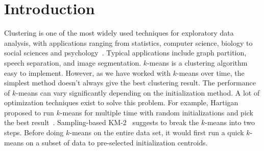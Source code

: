 \documentclass{acm_proc_article-sp}
\begin{document}


\section{Introduction}
Clustering is one of the most widely used techniques for exploratory data analysis,  with applications ranging from statistics, computer science, biology to social sciences and psychology~\cite{von2007tutorial}. Typical applications include graph partition, speech separation, and image segmentation. $k$-means is a  
clustering algorithm easy to implement. However, as we have worked with $k$-means over time, the simplest method doesn't always give the best clustering result. The performance of $k$-means can vary significantly depending on the initialization method. A lot of optimization techniques exist to solve this problem. For example, Hartigan proposed to run $k$-means for multiple time with random initializations and pick the best result~\cite{hartigan1979algorithm}. Sampling-based KM-2~\cite{yan2009fast} suggests to break the $k$-means into two steps. Before doing $k$-means on the entire data set, it would first run a quick $k$-means on a subset of data to pre-selected initialization centroids. 
\end{document}
